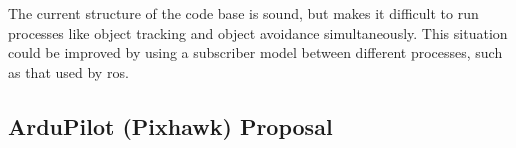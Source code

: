 \documentclass[a4paper, 11pt, titlepage]{article}
\begin{document}


  The current structure of the code base is sound, but makes it difficult to run processes like object tracking and object avoidance simultaneously.  This situation could be improved by using a subscriber model between different processes, such as that used by \gls{ros}.







\pagebreak
\renewcommand{\refname}{References}


%

\pagebreak

\printglossaries


\begin{appendices}




  \section{ArduPilot (Pixhawk) Proposal} \label{sec:PihawkProposal}
    

\end{appendices}

  
\end{document}
